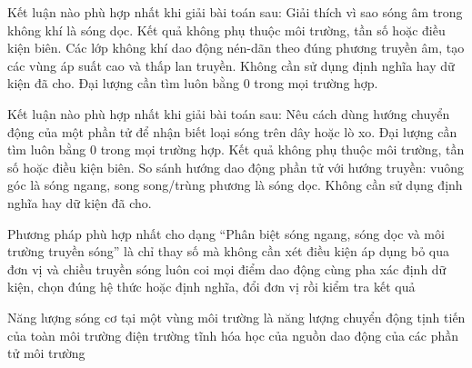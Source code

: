 \begin{ex}
Kết luận nào phù hợp nhất khi giải bài toán sau: Giải thích vì sao sóng âm trong không khí là sóng dọc.
\choice
{Kết quả không phụ thuộc môi trường, tần số hoặc điều kiện biên.}
{\True Các lớp không khí dao động nén-dãn theo đúng phương truyền âm, tạo các vùng áp suất cao và thấp lan truyền.}
{Không cần sử dụng định nghĩa hay dữ kiện đã cho.}
{Đại lượng cần tìm luôn bằng 0 trong mọi trường hợp.}
\end{ex}

\begin{ex}
Kết luận nào phù hợp nhất khi giải bài toán sau: Nêu cách dùng hướng chuyển động của một phần tử để nhận biết loại sóng trên dây hoặc lò xo.
\choice
{Đại lượng cần tìm luôn bằng 0 trong mọi trường hợp.}
{Kết quả không phụ thuộc môi trường, tần số hoặc điều kiện biên.}
{\True So sánh hướng dao động phần tử với hướng truyền: vuông góc là sóng ngang, song song/trùng phương là sóng dọc.}
{Không cần sử dụng định nghĩa hay dữ kiện đã cho.}
\end{ex}

\begin{ex}
Phương pháp phù hợp nhất cho dạng “Phân biệt sóng ngang, sóng dọc và môi trường truyền sóng” là
\choice
{chỉ thay số mà không cần xét điều kiện áp dụng}
{bỏ qua đơn vị và chiều truyền sóng}
{luôn coi mọi điểm dao động cùng pha}
{\True xác định dữ kiện, chọn đúng hệ thức hoặc định nghĩa, đổi đơn vị rồi kiểm tra kết quả}
\end{ex}

\begin{ex}
Năng lượng sóng cơ tại một vùng môi trường là năng lượng
\choice
{chuyển động tịnh tiến của toàn môi trường}
{điện trường tĩnh}
{hóa học của nguồn}
{\True dao động của các phần tử môi trường}
\end{ex}

